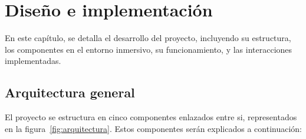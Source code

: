 \documentclass[a4paper, 12pt]{book}
\begin{document}

\cleardoublepage
\chapter{Diseño e implementación}
\label{sec:diseno}

En este capítulo, se detalla el desarrollo del proyecto, incluyendo su estructura, los componentes en el entorno 
inmersivo, su funcionamiento, y las interacciones implementadas.


\section{Arquitectura general} 
\label{sec:arquitectura}

El proyecto se estructura en cinco componentes enlazados entre si, representados en la figura~\ref{fig:arquitectura}. Estos componentes serán explicados a continuación:
\end{document}
